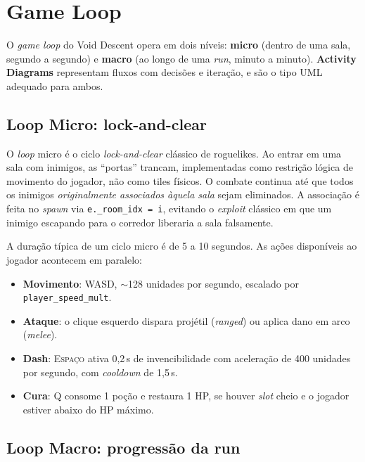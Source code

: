 \chapter{Game Loop}

O \emph{game loop} do Void Descent opera em dois níveis: \textbf{micro} (dentro de uma
sala, segundo a segundo) e \textbf{macro} (ao longo de uma \emph{run}, minuto a
minuto). \textbf{Activity Diagrams} representam fluxos com decisões e iteração, e são
o tipo UML adequado para ambos.

\section{Loop Micro: lock-and-clear}

O \emph{loop} micro é o ciclo \emph{lock-and-clear} clássico de roguelikes. Ao entrar
em uma sala com inimigos, as ``portas'' trancam, implementadas como restrição lógica
de movimento do jogador, não como tiles físicos. O combate continua até que todos os
inimigos \emph{originalmente associados àquela sala} sejam eliminados. A associação é
feita no \emph{spawn} via \texttt{e.\_room\_idx = i}, evitando o \emph{exploit}
clássico em que um inimigo escapando para o corredor liberaria a sala falsamente.

A duração típica de um ciclo micro é de 5 a 10 segundos. As ações disponíveis ao
jogador acontecem em paralelo:

\begin{itemize}
  \item \textbf{Movimento}: WASD, $\sim$128 unidades por segundo, escalado por
    \texttt{player\_speed\_mult}.
  \item \textbf{Ataque}: o clique esquerdo dispara projétil (\emph{ranged}) ou aplica
    dano em arco (\emph{melee}).
  \item \textbf{Dash}: \textsc{Espaço} ativa 0,2\,s de invencibilidade com aceleração
    de 400 unidades por segundo, com \emph{cooldown} de 1,5\,s.
  \item \textbf{Cura}: \textsc{Q} consome 1 poção e restaura 1 HP, se houver
    \emph{slot} cheio e o jogador estiver abaixo do HP máximo.
\end{itemize}


\section{Loop Macro: progressão da run}

